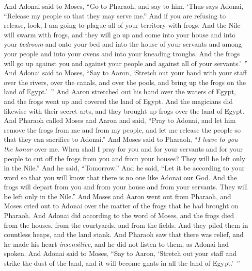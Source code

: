 \begin{biblechapter} %
  And Adonai said to Moses, “Go to Pharaoh, and say to him, ‘Thus says Adonai, “Release my people so that they may serve me.”
\verse And if you are refusing to release, look, I am going to plague all of your territory with frogs.
\verse And the Nile will swarm with frogs, and they will go up and come into your house and into your \textit{bedroom} and onto your bed and into the house of your servants and among your people and into your ovens and into your kneading troughs.
\verse And the frogs will go up against you and against your people and against all of your servants.’ ”
\verse And Adonai said to Moses, “Say to Aaron, ‘Stretch out your hand with your staff over the rivers, over the canals, and over the pools, and bring up the frogs on the land of Egypt.’ ”
\verse And Aaron stretched out his hand over the waters of Egypt, and the frogs went up and covered the land of Egypt.
\verse And the magicians did likewise with their secret arts, and they brought up frogs over the land of Egypt.
\verse And Pharaoh called Moses and Aaron and said, “Pray to Adonai, and let him remove the frogs from me and from my people, and let me release the people so that they can sacrifice to Adonai.”
\verse And Moses said to Pharaoh, “\textit{I leave to you the honor} over me. When shall I pray for you and for your servants and for your people to cut off the frogs from you and from your houses? They will be left only in the Nile.”
\verse And he said, “Tomorrow.” And he said, “Let it be according to your word so that you will know that there is no one like Adonai our God.
\verse And the frogs will depart from you and from your house and from your servants. They will be left only in the Nile.”
\verse And Moses and Aaron went out from Pharaoh, and Moses cried out to Adonai over the matter of the frogs that he had brought on Pharaoh.
\verse And Adonai did according to the word of Moses, and the frogs died from the houses, from the courtyards, and from the fields.
\verse And they piled them in countless heaps, and the land stank.
\verse And Pharaoh saw that there was relief, and he made his heart \textit{insensitive}, and he did not listen to them, as Adonai had spoken.
 And Adonai said to Moses, “Say to Aaron, ‘Stretch out your staff and strike the dust of the land, and it will become gnats in all the land of Egypt.’ ”

\end{biblechapter}
